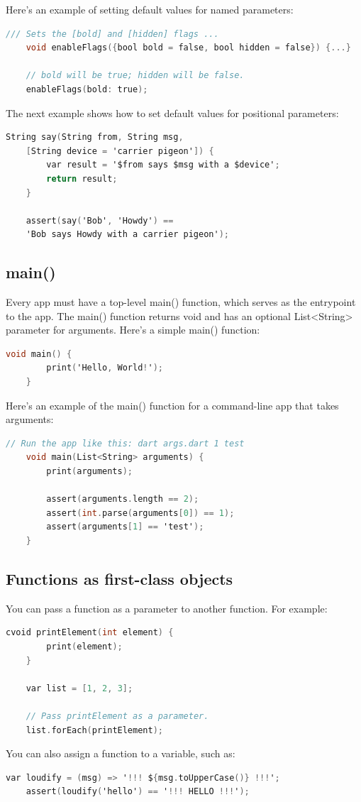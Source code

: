 Here's an example of setting default values for named parameters:
\begin{lstlisting}[language=C]
	/// Sets the [bold] and [hidden] flags ...
	void enableFlags({bool bold = false, bool hidden = false}) {...}
	
	// bold will be true; hidden will be false.
	enableFlags(bold: true);
\end{lstlisting}
The next example shows how to set default values for positional parameters:

\begin{lstlisting}[language=C]
	String say(String from, String msg,
	[String device = 'carrier pigeon']) {
		var result = '$from says $msg with a $device';
		return result;
	}
	
	assert(say('Bob', 'Howdy') ==
	'Bob says Howdy with a carrier pigeon');
\end{lstlisting}
\subsection{main()}
Every app must have a top-level main() function, which serves as the entrypoint to the app. The main() function returns void and has an optional List<String> parameter for arguments.
Here's a simple main() function:
\begin{lstlisting}[language=C]
	void main() {
		print('Hello, World!');
	}
\end{lstlisting}
Here's an example of the main() function for a command-line app that takes arguments:

\begin{lstlisting}[language=C]
	// Run the app like this: dart args.dart 1 test
	void main(List<String> arguments) {
		print(arguments);
		
		assert(arguments.length == 2);
		assert(int.parse(arguments[0]) == 1);
		assert(arguments[1] == 'test');
	}
\end{lstlisting}
\subsection{Functions as first-class objects}
You can pass a function as a parameter to another function. For example:
\begin{lstlisting}[language=C]
	cvoid printElement(int element) {
		print(element);
	}
	
	var list = [1, 2, 3];
	
	// Pass printElement as a parameter.
	list.forEach(printElement);
\end{lstlisting}
You can also assign a function to a variable, such as:
\begin{lstlisting}[language=C]
	var loudify = (msg) => '!!! ${msg.toUpperCase()} !!!';
	assert(loudify('hello') == '!!! HELLO !!!');
\end{lstlisting}
